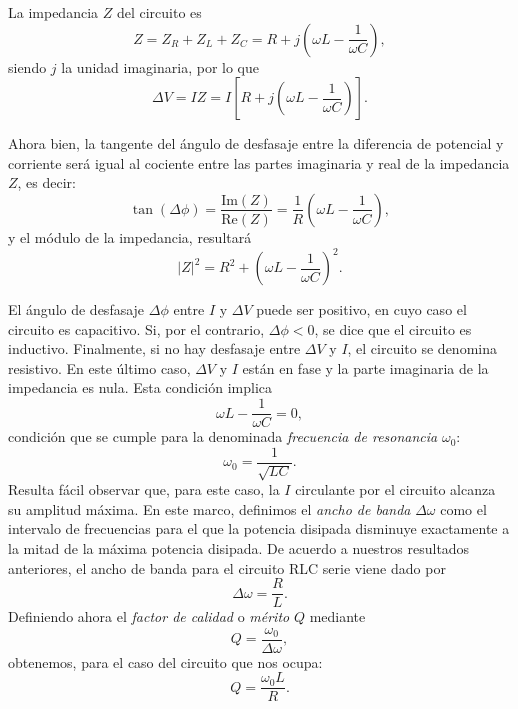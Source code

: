 \documentclass[laboratorio]{guia}
\begin{document}
La impedancia $Z$ del circuito es 
\begin{equation}
    Z = Z_R + Z_L + Z_C = R + j \left( \omega L - \frac{1}{\omega C} \right),
\end{equation}
siendo $j$ la unidad imaginaria, por lo que
\begin{equation}
    \Delta V = I Z = I \left[ R + j \left( \omega L - \frac{1}{\omega C} \right) \right].
\end{equation}

Ahora bien, la tangente del ángulo de desfasaje entre la diferencia de potencial y corriente será igual al cociente entre las partes imaginaria y real de la impedancia $Z$, es decir:
\begin{equation}
    \tan \left( \Delta \phi \right) = \frac{\text{Im} (Z)}{\text{Re} (Z)} = 
    \frac{1}{R} \left(\omega L - \frac{1}{\omega C} \right),
\end{equation}
y el módulo de la impedancia, resultará
\begin{equation}
    |Z|^2 = R^2 + \left( \omega L - \frac{1}{\omega C} \right)^2.
\end{equation}

El ángulo de desfasaje \(\Delta \phi\) entre \(I\) y \(\Delta V\) puede ser positivo, en cuyo caso el circuito es capacitivo.
Si, por el contrario, \( \Delta \phi < 0\), se dice que el circuito es inductivo.
Finalmente, si no hay desfasaje entre \(\Delta V\) y \(I\), el circuito se denomina resistivo.
En este último caso, \(\Delta V\) y \(I\) están en fase y la parte imaginaria de la impedancia es nula.
Esta condición implica
\begin{equation}
    \omega L - \frac{1}{\omega C} = 0,
\end{equation}
condición que se cumple para la denominada {\it frecuencia de resonancia} 
$\omega_0$:
\begin{equation}
    \omega_0 = \frac{1}{\sqrt{LC}}.
\end{equation}
Resulta fácil observar que, para este caso, la \(I\) circulante por el circuito alcanza su amplitud máxima.
En este marco, definimos el {\it ancho de banda} $\Delta \omega$ como el intervalo de frecuencias para el que la potencia disipada disminuye exactamente a la mitad de la máxima potencia disipada.
De acuerdo a nuestros resultados anteriores, el ancho de banda para el circuito RLC serie viene dado por
\begin{equation}
    \Delta \omega = \frac{R}{L}.
\end{equation}
Definiendo ahora el {\it factor de calidad} o {\it mérito} $Q$ mediante
\begin{equation}
    Q = \frac{\omega_0}{\Delta \omega},
\end{equation}
obtenemos, para el caso del circuito que nos ocupa:
\begin{equation}
    Q = \frac{\omega_0 L}{R}.
\end{equation}
\end{document}
